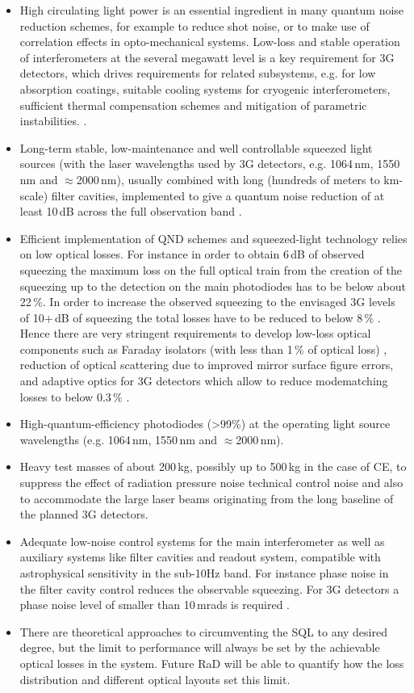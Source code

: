 \begin{itemize}
\item High circulating light power is an essential ingredient in many quantum noise reduction schemes, for example to reduce shot noise, or to make use of correlation effects in opto-mechanical systems. Low-loss and stable operation of interferometers at the several megawatt level   is a key requirement for  \ac{3G}   detectors,  which drives requirements for related subsystems, e.g.  for low absorption coatings, suitable cooling systems for cryogenic interferometers, sufficient thermal compensation schemes and mitigation of parametric instabilities.  .
\item  Long-term  stable,  low-maintenance  and well controllable squeezed light sources (with the laser wavelengths used by  \ac{3G}   detectors, e.g. 1064\,nm, 1550\,nm and $\approx$2000\,nm), usually combined with long (hundreds  of meters to km-scale) filter cavities, implemented to give a quantum noise reduction of  at least  10\,dB  across the full observation band .
\item Efficient implementation of \ac{QND} schemes and squeezed-light technology relies on  low optical losses. For instance in order to obtain 6\,dB of observed squeezing the maximum loss on the full optical train from the creation of the squeezing up to the detection on the main photodiodes has to be below about 22\,\%. In order to increase the observed squeezing to the envisaged  \ac{3G}   levels of 10+\,dB of squeezing the total losses have to be reduced to below 8\,\% \cite{LSC_IS_WP}. Hence there are very stringent requirements to develop  low-loss optical components such as Faraday isolators (with less than 1\,\% of optical loss) , reduction of optical scattering due to improved mirror surface figure errors, and adaptive optics for  \ac{3G}   detectors  which allow to reduce modematching losses to below 0.3\,\% . 
\item High-quantum-efficiency photodiodes (>99\%) at the operating light source wavelengths (e.g. 1064\,nm, 1550\,nm and $\approx$2000\,nm).
\item Heavy test masses of about 200\,kg,  possibly up to 500\,kg in the case of CE,  to suppress the effect of radiation pressure noise technical control noise and also to accommodate the large laser beams originating from the long baseline of the planned  \ac{3G}   detectors.
\item Adequate low-noise control systems for the main interferometer as well as auxiliary systems like filter cavities and readout system, compatible with astrophysical sensitivity in the sub-10Hz band.
For instance phase noise in the filter cavity control reduces the observable squeezing. For  \ac{3G}   detectors a phase noise level of smaller than 10\,mrads is required \cite{LSC_IS_WP}.
\item There are theoretical approaches to circumventing the \ac{SQL} to any desired degree, but the limit to performance will always be set by the achievable optical losses in the system. Future  \ac{RaD}   will be able to quantify how the loss distribution and different optical layouts set this limit.
\end{itemize}

